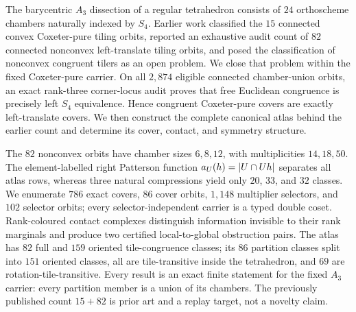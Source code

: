 The barycentric $A_3$ dissection of a regular tetrahedron consists of $24$
orthoscheme chambers naturally indexed by $S_4$.  Earlier work classified the
$15$ connected convex Coxeter-pure tiling orbits, reported an exhaustive audit
count of $82$ connected nonconvex left-translate tiling orbits, and posed the
classification of nonconvex congruent tilers as an open problem.  We close
that problem within the fixed Coxeter-pure carrier.  On all $2{,}874$ eligible
connected chamber-union orbits, an exact rank-three corner-locus audit proves
that free Euclidean congruence is precisely left $S_4$ equivalence.  Hence
congruent Coxeter-pure covers are exactly left-translate covers.  We then
construct the complete canonical atlas behind the earlier count and determine
its cover, contact, and symmetry structure.

The $82$ nonconvex orbits have chamber sizes $6,8,12$, with multiplicities
$14,18,50$.  The element-labelled right Patterson function
$a_U(h)=\lvert U\cap Uh\rvert$ separates all atlas rows, whereas three natural
compressions yield only $20$, $33$, and $32$ classes.  We enumerate $786$
exact covers, $86$ cover orbits, $1{,}148$ multiplier selectors, and $102$
selector orbits; every selector-independent carrier is a typed double coset.
Rank-coloured contact complexes distinguish information invisible to their
rank marginals and produce two certified local-to-global obstruction pairs.
The atlas has $82$ full and $159$ oriented tile-congruence classes; its $86$
partition classes split into $151$ oriented classes, all are tile-transitive
inside the tetrahedron, and $69$ are rotation-tile-transitive.  Every result is
an exact finite statement for the fixed $A_3$ carrier: every partition member
is a union of its chambers.  The previously published count $15+82$ is prior
art and a replay target, not a novelty claim.
